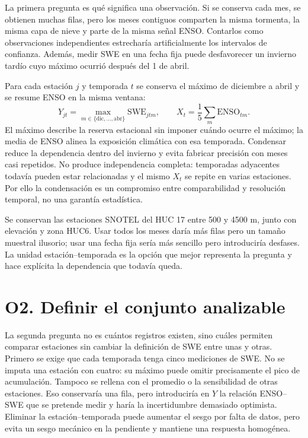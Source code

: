 \documentclass[10pt,a4paper]{article}
\begin{document}
La primera pregunta es qué significa una observación. Si se conserva cada
mes, se obtienen muchas filas, pero los meses contiguos comparten la misma
tormenta, la misma capa de nieve y parte de la misma señal ENSO. Contarlos
como observaciones independientes estrecharía artificialmente los intervalos
de confianza. Además, medir SWE en una fecha fija puede desfavorecer un
invierno tardío cuyo máximo ocurrió después del 1 de abril.

Para cada estación \(j\) y temporada \(t\) se conserva el máximo de diciembre a
abril y se resume ENSO en la misma ventana:
\[
Y_{jt}=\max_{m\in\{\mathrm{dic},\ldots,\mathrm{abr}\}}\mathrm{SWE}_{jtm},
\qquad
X_t=\frac{1}{5}\sum_{m}\mathrm{ENSO}_{tm}.
\]
El máximo describe la reserva estacional sin imponer cuándo ocurre el máximo;
la media de ENSO alinea la exposición climática con esa temporada. Condensar
reduce la dependencia dentro del invierno y evita fabricar precisión con
meses casi repetidos. No produce independencia completa: temporadas
adyacentes todavía pueden estar relacionadas y el mismo \(X_t\) se repite en
varias estaciones. Por ello la condensación es un compromiso entre
comparabilidad y resolución temporal, no una garantía estadística.

Se conservan las estaciones SNOTEL del HUC 17 entre 500 y 4500 m, junto con
elevación y zona HUC6. Usar todos los meses daría más filas pero un tamaño
muestral ilusorio; usar una fecha fija sería más sencillo pero introduciría
desfases. La unidad estación--temporada es la opción que mejor representa la
pregunta y hace explícita la dependencia que todavía queda.

\section{O2. Definir el conjunto analizable}

La segunda pregunta no es cuántos registros existen, sino cuáles permiten
comparar estaciones sin cambiar la definición de SWE entre unas y otras.
Primero se exige que cada temporada tenga cinco mediciones de SWE. No se
imputa una estación con cuatro: su máximo puede omitir precisamente el pico
de acumulación. Tampoco se rellena con el promedio o la sensibilidad de otras
estaciones. Eso conservaría una fila, pero introduciría en \(Y\) la relación
ENSO--SWE que se pretende medir y haría la incertidumbre demasiado optimista.
Eliminar la estación--temporada puede aumentar el sesgo por falta de datos,
pero evita un sesgo mecánico en la pendiente y mantiene una respuesta
homogénea.
\end{document}
